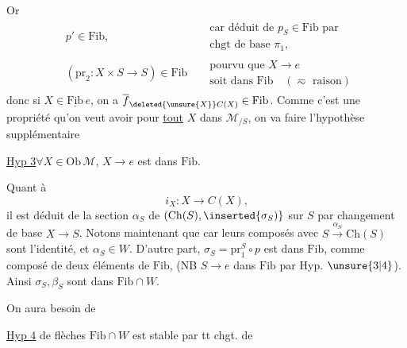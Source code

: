 Or
\[
\begin{aligned}
&p'\in\mathrm{Fib}, &&\substack{\text{car déduit de }p_S\in\mathrm{Fib}\text{ par}\\\text{chgt de base }\pi_1,}\\
&(\mathrm{pr}_2:X\times S\longrightarrow S)\in\mathrm{Fib} &&\substack{\text{pourvu que }X\longrightarrow e\\\text{soit dans }\mathrm{Fib}\quad(\eqsim\text{ raison})}
\end{aligned}
\]
donc si $X\in\underline{\mathrm{Fib}}\,e$, on a $\overline f_{\deleted{\unsure{X}}C(X)}\in\mathrm{Fib}$. Comme c'est une propriété  qu'on veut avoir pour \uline{tout} $X$ dans $\mathcal M_{/S}$, on va faire l'hypothèse supplémentaire

\uline{Hyp 3}\quad $\forall X\in\mathrm{Ob}\,\mathcal M$, $X\longrightarrow e$ est dans $\mathrm{Fib}$.

Quant à 
\[
i_X:X\longrightarrow C(X)\text{,}
\]
il est déduit de la section $\alpha_S$ de $(\mathrm{Ch}(S),\inserted{\sigma_S)}$ sur $S$ par changement de base $X\longrightarrow S$. Notons maintenant que 
car leurs composés avec $S\xrightarrow{\alpha_S}\mathrm{Ch}(S)$ sont l'identité, et $\alpha_S\in W$. D'autre part, $\sigma_S=\mathrm{pr}_1^S\circ p$ est dans $\mathrm{Fib}$, comme composé de deux éléments de $\mathrm{Fib}$, (NB $S\longrightarrow e$ dans $\mathrm{Fib}$ par Hyp. $\unsure{3|4}$). Ainsi $\sigma_S,\beta_S$ sont dans $\mathrm{Fib}\cap W$.

On aura besoin de

\uline{Hyp 4}\quad {}  de flèches $\mathrm{Fib}\cap W$ est stable par tt chgt. de 
